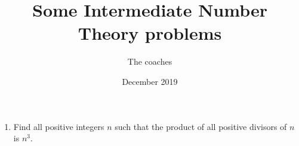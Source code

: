 \documentclass[a4paper,12pt]{article}
\begin{document}
\title {Some Intermediate Number Theory problems}
\author{The coaches}
\date{December 2019}
\maketitle


\begin{enumerate}

\item %
Find all positive integers $n$ such that the product of all positive divisors of $n$ is $n^3$.

\end{enumerate}
\end{document}
